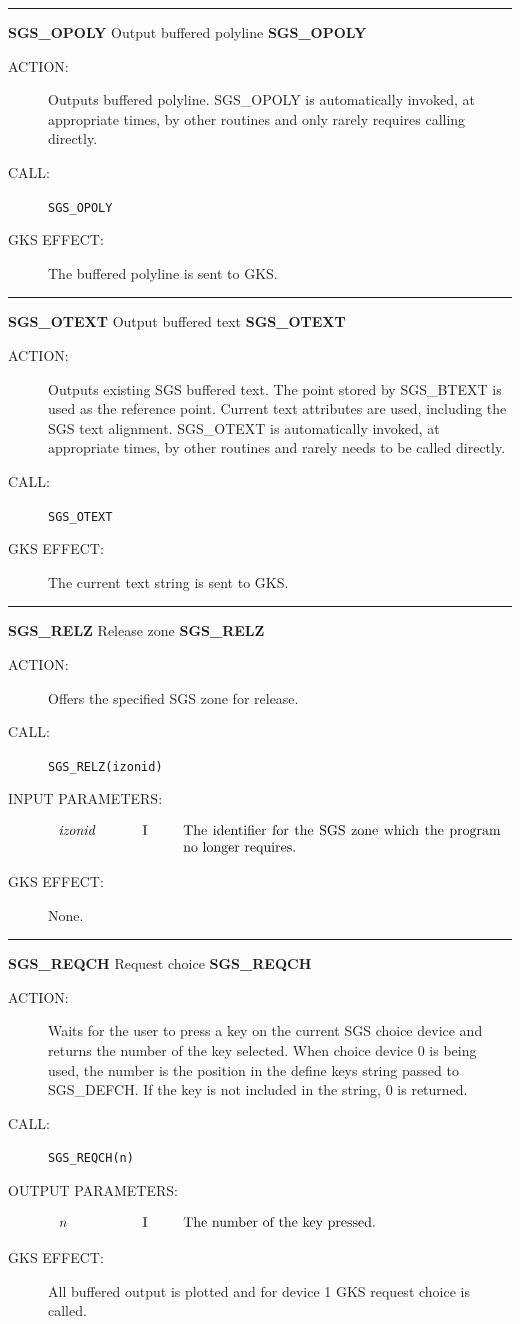 \documentclass[11pt]{article}
\newcommand{\htmlref}[2]{#1}
\newcommand{\xlabel}[1]{}
\newcommand{\rthead}[2]{\rule{\textwidth}{0.3mm}
{\Large {\bf #1} \hfill #2 \hfill {\bf #1}}}
\newenvironment{params}%
{\[\begin{tabular}{p{0.14\textwidth}p{0.05\textwidth}p{0.66\textwidth}}}%
{\end{tabular}\]}
\newcommand{\rparams}[3]{{\em #1} &#2 &#3\\}
\newcommand{\rthead}[2]{\subsection{\label{#1}\xlabel{#1}#1 - #2}}
\newenvironment{params}{\begin{description}}{\end{description}}
\newcommand{\rparams}[3]{\item{{\em #1}} (#2) #3}
\begin{document}
\rthead{SGS\_OPOLY}{Output buffered polyline}
\begin{description}
\item [ACTION:]
Outputs buffered polyline.
SGS\_OPOLY is automatically invoked, at appropriate times, by other routines and
only rarely requires calling directly.
\item [CALL:]
{\tt SGS\_OPOLY}
\item [GKS EFFECT:]
The buffered polyline is sent to GKS.
\end{description}
\goodbreak

\rthead{SGS\_OTEXT}{Output buffered text}
\begin{description}
\item [ACTION:]
Outputs existing SGS buffered text.
The point stored by \htmlref{SGS\_BTEXT}{SGS_BTEXT}
is used as the reference point.
Current text attributes are used, including the SGS text alignment.
SGS\_OTEXT is automatically invoked, at appropriate times, by other routines and
rarely needs to be called directly.
\item [CALL:]
{\tt SGS\_OTEXT}
\item [GKS EFFECT:]
The current text string is sent to GKS.
\end{description}
\goodbreak

\rthead{SGS\_RELZ}{Release zone}
\begin{description}
\item [ACTION:]
Offers the specified SGS zone for release.
\item [CALL:]
{\tt SGS\_RELZ(izonid)}
\item [INPUT PARAMETERS:]
\begin{params}
\rparams{izonid}{I}{The identifier for the SGS zone which the program no longer
requires.}
\end{params}
\item [GKS EFFECT:]
None.
\end{description}
\goodbreak

\rthead{SGS\_REQCH}{Request choice}
\begin{description}
\item [ACTION:]
Waits for the user to press a key on the current SGS choice device
and returns the number of the key selected.
When choice device 0 is being used, the number is the position in the define
keys string passed to \htmlref{SGS\_DEFCH}{SGS_DEFCH}.
If the key is not included in the string, 0 is returned.
\item [CALL:]
{\tt SGS\_REQCH(n)}
\item [OUTPUT PARAMETERS:]
\begin{params}
\rparams{n}{I}{The number of the key pressed.}
\end{params}
\item [GKS EFFECT:]
All buffered output is plotted and for device 1 GKS request choice is called.
\end{description}
\goodbreak
\end{document}
